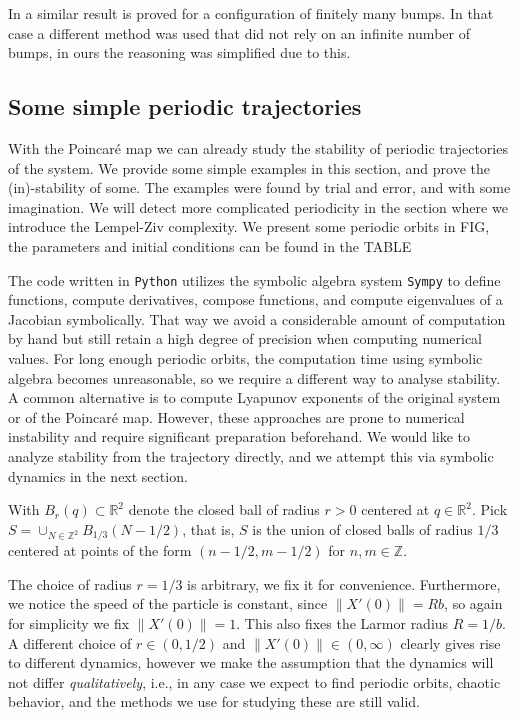 In \cite{Knauf_2017} a similar result is proved for a configuration of finitely many bumps. In that case a different method was used that did not rely on an infinite number of bumps, in ours the reasoning was simplified due to this.

\subsection{Some simple periodic trajectories}

With the Poincar\'e map we can already study the stability of periodic trajectories of the system. We provide some simple examples in this section, and prove the (in)-stability of some. The examples were found by trial and error, and with some imagination. We will detect more complicated periodicity in the section where we introduce the Lempel-Ziv complexity. We present some periodic orbits in FIG, the parameters and initial conditions can be found in the TABLE



The code written in \texttt{Python} utilizes the symbolic algebra system \texttt{Sympy} to define functions, compute derivatives, compose functions, and compute eigenvalues of a Jacobian symbolically. That way we avoid a considerable amount of computation by hand but still retain a high degree of precision when computing numerical values. For long enough periodic orbits, the computation time using symbolic algebra becomes unreasonable, so we require a different way to analyse stability. A common alternative is to compute Lyapunov exponents of the original system or of the Poincar\'e map. However, these approaches are prone to numerical instability and require significant preparation beforehand. We would like to analyze stability from the trajectory directly, and we attempt this via symbolic dynamics in the next section.


\color{red}
With $B_r(q)\subset \mathbb R^2$ denote the closed ball of radius $r>0$ centered at $q\in\mathbb R^2$. Pick $S=\cup_{N\in\mathbb Z^2}B_{1/3}(N-1/2)$, that is, $S$ is the union of closed balls of radius $1/3$ centered at points of the form $(n-1/2,m-1/2)$ for $n,m\in\mathbb Z$.

The choice of radius $r=1/3$ is arbitrary, we fix it for convenience. Furthermore, we notice the speed of the particle is constant, since $\|X'(0)\|=Rb$, so again for simplicity we fix $\|X'(0)\|=1$. This also fixes the Larmor radius $R=1/b$. A different choice of $r\in (0,1/2)$ and $\|X'(0)\|\in(0,\infty)$ clearly gives rise to different dynamics, however we make the assumption that the dynamics will not differ \textit{qualitatively}, i.e., in any case we expect to find periodic orbits, chaotic behavior, and the methods we use for studying these are still valid.

